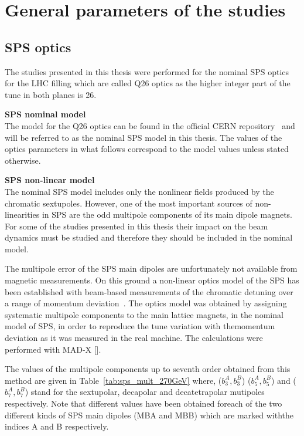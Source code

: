 \section{General parameters of the studies}
\subsection{SPS optics}\label{subsec:SPS_optics_model}
 The studies presented in this thesis were performed for the nominal SPS optics for the LHC filling which are called Q26 optics as the higher integer part of the tune in both planes is 26. 

 \normalsize{\textbf{SPS nominal model}\\
 The model for the Q26 optics can be found in the official CERN repository~\cite{SPS_optics_repo} and will be referred to as the nominal SPS model in this thesis. The values of the optics parameters in what follows correspond to the model values unless stated otherwise.

 \normalsize{\textbf{SPS non-linear model}\\
The nominal SPS model includes only the nonlinear fields produced by the chromatic sextupoles. However, one of the most important sources of non-linearities in SPS are the odd multipole components of its main dipole magnets. For some of the studies presented in this thesis their impact on the beam dynamics must be studied and therefore they should be included in the nominal model. 

The multipole error of the SPS main dipoles are unfortunately not available from magnetic measurements. On this ground a non-linear optics model of the SPS has been established with beam-based measurements of the chromatic detuning over a range of momentum deviation~\cite{Carlà:2664976, Alekou:2640326}.  The optics model was obtained by assigning systematic multipole components to the main lattice magnets, in the nominal model of SPS, in order to reproduce the tune variation with themomentum deviation as it was measured in the real machine. The calculations were performed with MAD-X [].

The values of the multipole components up to seventh order obtained from this method are given in Table~\ref{tab:sps_mult_270GeV} where, ($b_3^A, b_3^B$) ($b_5^A, b_5^B$) and ($b_7^A, b_7^B$) stand for the sextupolar, decapolar and decatetrapolar mutipoles respectively. Note that different values have been obtained foreach of the two different kinds of SPS main dipoles (MBA and MBB) which are marked withthe indices A and B respectively.

}}
